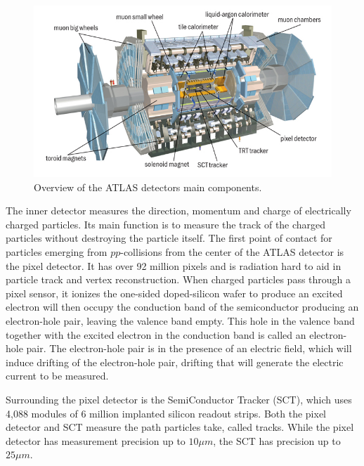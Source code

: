 \begin{figure}[h]
    \centering
    \includegraphics[width=.8\textwidth]{content/img/ATLAS_Detector.jpg}
    \caption{Overview of the ATLAS detectors main components.\cite{ATLAS_Illustration}}
    \label{fig:intro_ATLAS_detector}
\end{figure}


The inner detector measures the direction, momentum and charge of electrically charged particles.
Its main function is to measure the track of the charged particles without destroying the particle itself.
The first point of contact for particles emerging from $pp$-collisions from the center of the ATLAS detector is the pixel detector.\cite{PixelDetector_2008}
It has over 92 million pixels and is radiation hard to aid in particle track and vertex reconstruction.
When charged particles pass through a pixel sensor, it ionizes the one-sided doped-silicon wafer to produce an excited electron will then occupy the conduction band of the semiconductor producing an electron-hole pair, leaving the valence band empty.\cite{KnollRadDetection}
This hole in the valence band together with the excited electron in the conduction band is called an electron-hole pair.
The electron-hole pair is in the presence of an electric field, which will induce drifting of the electron-hole pair, drifting that will generate the electric current to be measured.

Surrounding the pixel detector is the SemiConductor Tracker (SCT), which uses 4,088 modules of 6 million implanted silicon readout strips.\cite{ABDESSELAM2006642}
Both the pixel detector and SCT measure the path particles take, called tracks.
While the pixel detector has measurement precision up to $10 \mu m$, the SCT has precision up to $25\mu m$. 

